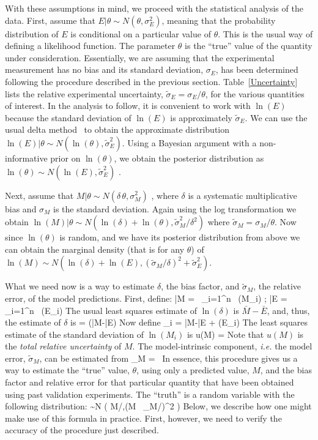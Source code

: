 With these assumptions in mind, we proceed with the statistical analysis of the data.
First, assume that $E|\theta \sim N(\theta,\sigma_E^2)$, meaning that the probability distribution of $E$
is conditional on a particular value of $\theta$. This is the usual way of defining a likelihood function. The parameter $\theta$ is the ``true'' value of the quantity under
consideration. Essentially, we are assuming that the experimental measurement has no bias and its standard deviation, $\sigma_E$, has been
determined following the procedure described in the
previous section. Table~\ref{Uncertainty} lists the relative experimental uncertainty, $\tilde{\sigma}_E=\sigma_E/\theta$, for the various quantities of interest.
In the analysis to follow, it is convenient to work with $\ln(E)$ because the standard deviation of $\ln(E)$ is approximately $\tilde{\sigma}_E$.
We can use the usual delta method~\cite{delta_method} to obtain the approximate distribution $\ln(E)|\theta \sim N(\ln(\theta),\tilde{\sigma}_E^2)$.
Using a Bayesian argument with a non-informative prior on $\ln(\theta)$, we obtain the posterior distribution as $\ln(\theta) \sim N(\ln(E),\tilde{\sigma}_E^2)$ .

Next, assume that $M|\theta \sim N(\delta \, \theta,\sigma_M^2)$ , where $\delta$ is a systematic multiplicative bias and $\sigma_M$ is the standard deviation.
Again using the log transformation we obtain $\ln(M)|\theta \sim N(\ln(\delta)+\ln(\theta),\tilde{\sigma}_M^2/\delta^2)$
where $\tilde{\sigma}_M=\sigma_M/\theta$. Now since $\ln(\theta)$ is random, and we have its posterior distribution from above we can obtain the marginal density
(that is for any $\theta$) of $\ln(M) \sim N(\ln(\delta)+\ln(E),(\tilde{\sigma}_M/\delta)^2+\tilde{\sigma}_E^2)$.

What we need now is a way to estimate $\delta$, the bias factor, and $\tilde{\sigma}_M$, the relative error, of the model predictions. First, define:
\be \bar{M} =  \, \sum_{i=1}^n \, \ln(M_i)  \quad ; \quad \bar{E} =  \, \sum_{i=1}^n \, \ln(E_i) \ee
The usual least squares estimate of $\ln(\delta)$ is $\bar{M}-\bar{E}$, and, thus, the estimate of $\delta$ is
\be \hat{\delta} = \exp(\bar{M}-\bar{E}) \ee
Now define
\be {}_i = \bar{M}-\bar{E} + \ln(E_i) \ee
The least squares estimate of the standard deviation of $\ln(M_i)$ is
\be u(M) =  \approx {} \ee
Note that $u(M)$ is the {\em total relative uncertainty} of $M$.
The model-intrinsic component, {\em i.e.} the model error, $\tilde{\sigma}_M$, can be estimated from
\be \tilde{\sigma}_M = \hat{\delta} \,  \label{model_error} \ee
In essence, this procedure gives us a way to estimate the ``true'' value, $\theta$, using only a predicted value, $M$, and the bias factor and relative error
for that particular quantity that have been obtained using past validation experiments. The ``truth'' is a random variable with the following distribution:
\be \theta \sim N \left( M/\delta,(M \, \tilde{\sigma}_M/\delta)^2 \right) \label{truth} \ee
Below, we describe how one might make use of this formula in practice. First, however, we need to verify the accuracy of the procedure just described.

